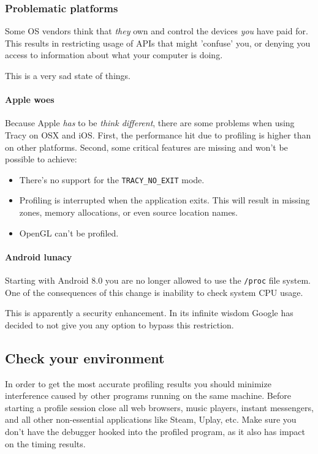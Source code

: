 \documentclass[hidelinks,titlepage,a4paper]{article}
\begin{document}
\subsubsection{Problematic platforms}

Some OS vendors think that \emph{they} own and control the devices \emph{you} have paid for. This results in restricting usage of APIs that might 'confuse' you, or denying you access to information about what your computer is doing.

This is a very sad state of things.

\paragraph{Apple woes}

Because Apple \emph{has} to be \emph{think different}, there are some problems when using Tracy on OSX and iOS. First, the performance hit due to profiling is higher than on other platforms. Second, some critical features are missing and won't be possible to achieve:

\begin{itemize}
\item There's no support for the \texttt{TRACY\_NO\_EXIT} mode.
\item Profiling is interrupted when the application exits. This will result in missing zones, memory allocations, or even source location names.
\item OpenGL can't be profiled.
\end{itemize}

\paragraph{Android lunacy}

Starting with Android 8.0 you are no longer allowed to use the \texttt{/proc} file system. One of the consequences of this change is inability to check system CPU usage.

This is apparently a security enhancement. In its infinite wisdom Google has decided to not give you any option to bypass this restriction.

\subsection{Check your environment}

In order to get the most accurate profiling results you should minimize interference caused by other programs running on the same machine. Before starting a profile session close all web browsers, music players, instant messengers, and all other non-essential applications like Steam, Uplay, etc. Make sure you don't have the debugger hooked into the profiled program, as it also has impact on the timing results.
\end{document}
